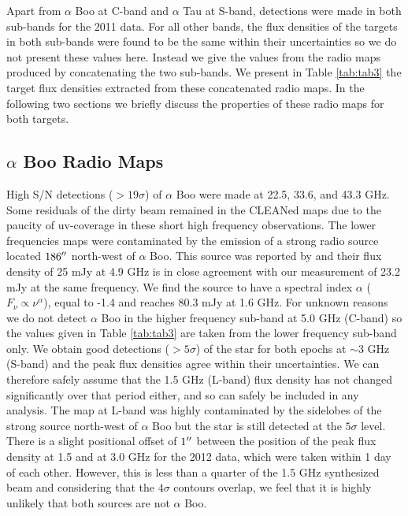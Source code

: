 \documentclass[iop]{emulateapj}
\begin{document}
Apart from $\alpha$ Boo at C-band and $\alpha$ Tau at S-band, detections were made in both sub-bands for the 2011 data. For all other bands, the flux densities of the targets in both sub-bands were found to be the same within their uncertainties so we do not present these values here. Instead we give the values from the radio maps produced by concatenating the two sub-bands. We present in Table \ref{tab:tab3} the target flux densities extracted from these concatenated radio maps. In the following two sections we briefly discuss the properties of these radio maps for both targets.

\subsection{$\alpha$ Boo Radio Maps} \label{results1} 
High S/N detections ($>19\sigma$) of $\alpha$ Boo were made at 22.5, 33.6, and 43.3 GHz. Some residuals of the dirty beam remained in the CLEANed maps due to the paucity of uv-coverage in these short high frequency observations. The lower frequencies maps were contaminated by the emission of a strong radio source located $186\mbox{$^{\prime\prime}$}$ north-west of $\alpha$ Boo. This source was reported by \cite{1986AJ.....91..602D} and their flux density of 25 mJy at 4.9 GHz is in close agreement with our measurement of 23.2 mJy at the same frequency. We find the source to have a spectral index $\alpha$ ($F_{\nu} \propto \nu ^{\alpha}$), equal to -1.4 and reaches 80.3 mJy at 1.6 GHz. For unknown reasons we do not detect $\alpha$ Boo in the higher frequency sub-band at 5.0 GHz (C-band) so the values given in Table \ref{tab:tab3} are taken from the lower frequency sub-band only. We obtain good detections ($>5\sigma$) of the star for both epochs at $\sim$3 GHz (S-band) and the peak flux densities agree within their uncertainties. We can therefore safely assume that the 1.5 GHz (L-band) flux density has not changed significantly over that period either, and so can safely be included in any analysis. The map at L-band was highly contaminated by the sidelobes of the strong source north-west of $\alpha$ Boo but the star is still detected at the $5\sigma$ level. There is a slight positional offset of $1\mbox{$^{\prime\prime}$}$ between the position of the peak flux density at 1.5 and at 3.0 GHz for the 2012 data, which were taken within 1 day of each other. However, this is less than a quarter of the 1.5 GHz synthesized beam and considering that the $4\sigma$ contours overlap, we feel that it is highly unlikely that both sources are not $\alpha$ Boo. 
\end{document}
